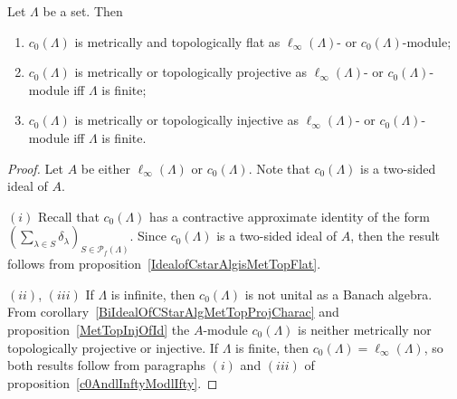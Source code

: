 \begin{proposition}\label{c0AndlInftyModc0} Let $\Lambda$ be a set. Then 

\begin{enumerate}[label = (\roman*)]
    \item $c_0(\Lambda)$ is metrically and topologically flat as
    $\ell_\infty(\Lambda)$- or $c_0(\Lambda)$-module;

    \item $c_0(\Lambda)$ is metrically or topologically projective as
    $\ell_\infty(\Lambda)$- or $c_0(\Lambda)$-module iff $\Lambda$ is finite;

    \item $c_0(\Lambda)$ is metrically or topologically injective as
    $\ell_\infty(\Lambda)$- or $c_0(\Lambda)$-module iff $\Lambda$ is finite.
\end{enumerate}
\end{proposition}
\begin{proof} Let $A$ be either $\ell_\infty(\Lambda)$ or $c_0(\Lambda)$. Note
that $c_0(\Lambda)$ is a two-sided ideal of $A$. 

$(i)$ Recall that $c_0(\Lambda)$ has a contractive approximate identity of the
form ${(\sum_{\lambda\in S}\delta_\lambda)}_{S\in\mathcal{P}_{f}(\Lambda)}$. Since
$c_0(\Lambda)$ is a two-sided ideal of $A$, then the result follows from
proposition~\ref{IdealofCstarAlgisMetTopFlat}.

$(ii)$, $(iii)$ If $\Lambda$ is infinite, then $c_0(\Lambda)$ is not unital as a 
Banach algebra. From corollary~\ref{BiIdealOfCStarAlgMetTopProjCharac} and
proposition~\ref{MetTopInjOfId} the $A$-module $c_0(\Lambda)$ is neither
metrically nor topologically projective or injective. If $\Lambda$ is finite,
then $c_0(\Lambda)=\ell_\infty(\Lambda)$, so both results follow from paragraphs
$(i)$ and $(iii)$ of proposition~\ref{c0AndlInftyModlIfty}.
\end{proof}

